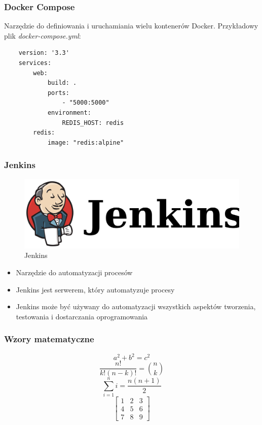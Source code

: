 \documentclass[polish]{beamer}
\begin{document}
\begin{frame}[fragile]
    \frametitle{Docker Compose}
    Narzędzie do definiowania i uruchamiania wielu kontenerów Docker.
    \newline
    Przykładowy plik \textit{docker-compose.yml}:



    \begin{lstlisting}
    version: '3.3'
    services:
        web:
            build: .
            ports:
                - "5000:5000"
            environment:
                REDIS_HOST: redis
        redis:
            image: "redis:alpine"
    \end{lstlisting}
\end{frame}

\begin{frame}
    \frametitle{Jenkins}
    \justifying
    \begin{figure}
        \includegraphics[width=0.5\linewidth]{images/jenkins.png}
        \caption{Jenkins}
        \label{fig:jenkins}
    \end{figure}
    \begin{itemize}
        \item Narzędzie do automatyzacji procesów
        \item Jenkins jest serwerem, który automatyzuje procesy
        \item Jenkins może być używany do automatyzacji wszystkich aspektów tworzenia, testowania i dostarczania oprogramowania
    \end{itemize}
\end{frame}

\begin{frame}
    \frametitle{Wzory matematyczne}
    \begin{equation*}
        a^2 + b^2 = c^2
    \end{equation*}
    \begin{equation*}
        \frac{n!}{k!(n-k)!} = \binom{n}{k}
    \end{equation*}
    \begin{equation*}
        \sum_{i=1}^{n} i = \frac{n(n+1)}{2}
    \end{equation*}
    \begin{equation*}
        \begin{bmatrix}
            1 & 2 & 3 \\
            4 & 5 & 6 \\
            7 & 8 & 9
        \end{bmatrix}
    \end{equation*}
\end{frame}
\end{document}
